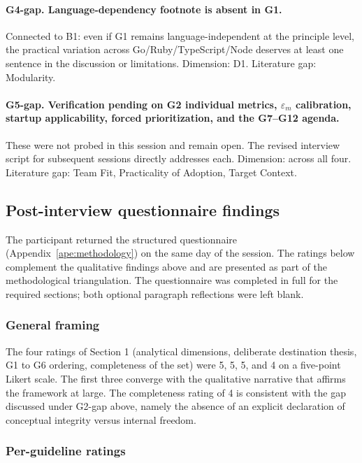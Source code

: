 \paragraph*{G4-gap. Language-dependency footnote is absent in G1.} Connected to B1: even if G1 remains language-independent at the principle level, the practical variation across Go/Ruby/TypeScript/Node deserves at least one sentence in the discussion or limitations. Dimension: D1. Literature gap: Modularity.

\paragraph*{G5-gap. Verification pending on G2 individual metrics, $\varepsilon_m$ calibration, startup applicability, forced prioritization, and the G7--G12 agenda.} These were not probed in this session and remain open. The revised interview script for subsequent sessions directly addresses each. Dimension: across all four. Literature gap: Team Fit, Practicality of Adoption, Target Context.

\subsection*{Post-interview questionnaire findings}

The participant returned the structured questionnaire (Appendix~\ref{ape:methodology}) on the same day of the session. The ratings below complement the qualitative findings above and are presented as part of the methodological triangulation. The questionnaire was completed in full for the required sections; both optional paragraph reflections were left blank.

\subsubsection*{General framing}

The four ratings of Section 1 (analytical dimensions, deliberate destination thesis, G1 to G6 ordering, completeness of the set) were 5, 5, 5, and 4 on a five-point Likert scale. The first three converge with the qualitative narrative that affirms the framework at large. The completeness rating of 4 is consistent with the gap discussed under G2-gap above, namely the absence of an explicit declaration of conceptual integrity versus internal freedom.

\subsubsection*{Per-guideline ratings}

